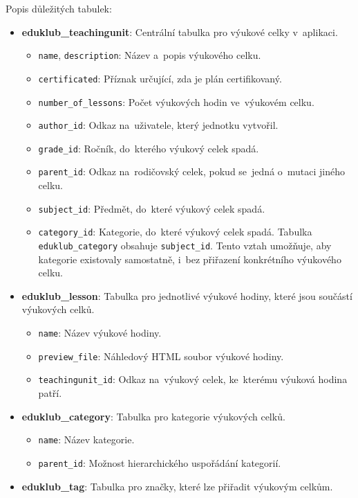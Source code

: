\documentclass[male,czech,api_bc]{kitheses}
\begin{document}
Popis důležitých tabulek:
\begin{itemize}
	\item \textbf{eduklub\_teachingunit}: Centrální tabulka pro výukové celky v~aplikaci.
	\begin{itemize}
		\item \texttt{name}, \texttt{description}: Název a~popis výukového celku.
		\item \texttt{certificated}: Příznak určující, zda je plán certifikovaný.
		\item \texttt{number\_of\_lessons}: Počet výukových hodin ve~výukovém celku.
		\item \texttt{author\_id}: Odkaz na~uživatele, který jednotku vytvořil.
		\item \texttt{grade\_id}: Ročník, do~kterého výukový celek spadá.
		\item \texttt{parent\_id}: Odkaz na~rodičovský celek, pokud se~jedná o~mutaci jiného celku.
		\item \texttt{subject\_id}: Předmět, do~které výukový celek spadá.
		\item \texttt{category\_id}: Kategorie, do~které výukový celek spadá. Tabulka \texttt{eduklub\_category} obsahuje \texttt{subject\_id}. Tento vztah umožňuje, aby kategorie existovaly samostatně, i~bez přiřazení konkrétního výukového celku.
	\end{itemize}
	
	\item \textbf{eduklub\_lesson}: Tabulka pro jednotlivé výukové hodiny, které jsou součástí výukových celků.
	\begin{itemize}
		\item \texttt{name}: Název výukové hodiny.
		\item \texttt{preview\_file}: Náhledový HTML soubor výukové hodiny.
		\item \texttt{teachingunit\_id}: Odkaz na~výukový celek, ke~kterému výuková hodina patří.
	\end{itemize}
	
	\item \textbf{eduklub\_category}: Tabulka pro kategorie výukových celků.
	\begin{itemize}
		\item \texttt{name}: Název kategorie.
		\item \texttt{parent\_id}: Možnost hierarchického uspořádání kategorií.
	\end{itemize}
	
	\item \textbf{eduklub\_tag}: Tabulka pro značky, které lze přiřadit výukovým celkům.
	

\end{itemize}
\end{document}

